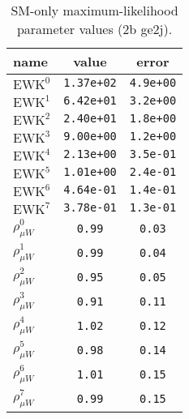 %

\begin{table}\centering
\caption{SM-only maximum-likelihood parameter values (2b ge2j).}
\label{tab:mlParameterValues2b_ge2j}
\begin{tabular}{lcc}name & value & error \\ \hline
$\mathrm{EWK}^{0}$ & {\tt  1.37e+02} & {\tt  4.9e+00}\\
$\mathrm{EWK}^{1}$ & {\tt  6.42e+01} & {\tt  3.2e+00}\\
$\mathrm{EWK}^{2}$ & {\tt  2.40e+01} & {\tt  1.8e+00}\\
$\mathrm{EWK}^{3}$ & {\tt  9.00e+00} & {\tt  1.2e+00}\\
$\mathrm{EWK}^{4}$ & {\tt  2.13e+00} & {\tt  3.5e-01}\\
$\mathrm{EWK}^{5}$ & {\tt  1.01e+00} & {\tt  2.4e-01}\\
$\mathrm{EWK}^{6}$ & {\tt  4.64e-01} & {\tt  1.4e-01}\\
$\mathrm{EWK}^{7}$ & {\tt  3.78e-01} & {\tt  1.3e-01}\\
$\rho_{\mu W}^{0}$ & {\tt 0.99} & {\tt 0.03}\\
$\rho_{\mu W}^{1}$ & {\tt 0.99} & {\tt 0.04}\\
$\rho_{\mu W}^{2}$ & {\tt 0.95} & {\tt 0.05}\\
$\rho_{\mu W}^{3}$ & {\tt 0.91} & {\tt 0.11}\\
$\rho_{\mu W}^{4}$ & {\tt 1.02} & {\tt 0.12}\\
$\rho_{\mu W}^{5}$ & {\tt 0.98} & {\tt 0.14}\\
$\rho_{\mu W}^{6}$ & {\tt 1.01} & {\tt 0.15}\\
$\rho_{\mu W}^{7}$ & {\tt 0.99} & {\tt 0.15}\\
\hline
\end{tabular}
\end{table}
%